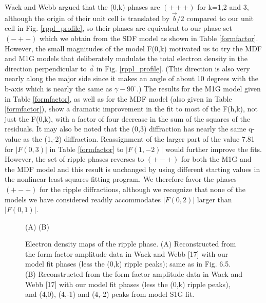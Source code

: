 Wack and Webb \cite{Wac89a} argued that the (0,k) phases are $(+++)$ for 
k=1,2 and 3,
although the origin of their unit cell is translated by $\vec{b}/2$
compared to our unit cell in Fig. \ref{rppl_profile}, so their
phases are equivalent to our phase set $(-+-)$ which we obtain
from the SDF model as shown in Table \ref{formfactor}.  However, the 
small magnitudes
of the model F(0,k) motivated us to try the MDF and M1G models that
deliberately modulate the total electron density in the direction 
perpendicular to $\vec{a}$ in Fig. \ref{rppl_profile}.  (This direction 
is also very nearly
along the major side since it makes an angle of about 10 degrees
with the b-axis which is nearly the same as $\gamma - 90^{\circ}$.)
The results for the M1G model given in Table \ref{formfactor}, as well as for
the MDF model (also given in Table \ref{formfactor}), show a dramatic
improvement in the fit to most of the F(h,k), not just the F(0,k), with
a factor of four decrease in the sum of the squares of the residuals.
It may also be noted that the (0,3) diffraction 
has nearly the same q-value as the (1,-2) diffraction.  Reassignment of the 
larger part of the value 7.81 for $|F(0,3)|$ in Table \ref{formfactor} 
to $|F(1,-2)|$ would further improve the fits.
However, the set of ripple phases reverses to $(+-+)$ for both the M1G and
the MDF model and this result is
unchanged by using different starting values in the nonlinear
least squares fitting program.  We therefore favor the phases $(+-+)$
for the ripple diffractions, although we recognize that none of
the models we have considered readily accommodates $|F(0,2)|$ larger
than $|F(0,1)|$.

\begin{figure}
\begin{center}
\leavevmode
\raggedleft
\hspace{0.1in}
\leavevmode
\raggedright
\hspace{0.6in}
\end{center}
\vspace{-0.2in}
\hspace{1.2in} (A) \hspace{2.9in} (B)
\caption{Electron density maps of the ripple phase. 
(A) Reconstructed from the form factor amplitude
data in Wack and Webb [17] with our model fit phases (less
the (0,k) ripple peaks); same as in Fig. 6.5. 
(B) Reconstructed from the form factor amplitude
data in Wack and Webb [17] with our model fit phases (less
the (0,k) ripple peaks), and (4,0), (4,-1) and (4,-2) peaks from
model S1G fit. 
\label{4kmap}}
\end{figure}

